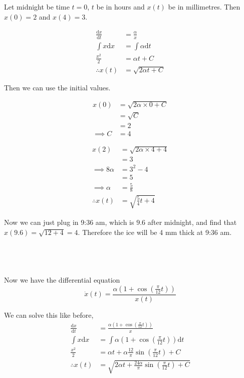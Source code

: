 \documentclass[a4paper]{article}
\begin{document}
\subsection{~}

Let midnight be time $t = 0$, $t$ be in hours and $x(t)$ be in millimetres. Then $x(0) = 2$ and $x(4) = 3$.

\begin{align*}
	\frac{\mathrm d x}{\mathrm d t} &= \frac{\alpha}{x}\\
	\int x \mathrm d x              &= \int \alpha \mathrm d t\\
	\frac{x^2}{2}                   &= \alpha t + C\\
	\therefore x(t)                 &= \sqrt{2\alpha t + C}
\end{align*}

Then we can use the initial values.

\begin{align*}
	x(0) &= \sqrt{2 \alpha \times 0 + C}\\
		 &= \sqrt C\\
		 &= 2\\
	\implies C &= 4
\end{align*}

\begin{align*}
	x(2) &= \sqrt{2 \alpha \times 4 + 4}\\
		 &= 3\\
	\implies 8 \alpha &= 3^2 - 4\\
					  &= 5\\
	\implies \alpha &= \frac58\\
	\therefore x(t) &= \sqrt{\frac54 t + 4}
\end{align*}

Now we can just plug in 9:36 am, which is $9.6$ after midnight, and find that $x(9.6) = \sqrt{12 + 4} = 4$. Therefore the ice will be 4 mm thick at 9:36 am.

\subsection{~}

Now we have the differential equation $$\dot x(t) = \frac{\alpha \left(1 + \cos\left( \frac{\pi}{12} t \right)\right)}{x(t)}$$

We can solve this like before, \begin{align*}
	\frac{\mathrm d x}{\mathrm d t} &= \frac{\alpha \left(1 + \cos\left( \frac{\pi}{12} t \right)\right)}{x}\\[1ex]
	\int x \mathrm d x &= \int \alpha \left( 1 + \cos\left(\frac{\pi}{12} t\right) \right) \mathrm d t\\[1ex]
	\frac{x^2}{2} &= \alpha t + \alpha \frac{12}{\pi} \sin \left(\frac{\pi}{12} t\right) + C\\[1ex]
	\therefore x(t) &= \sqrt{2\alpha t + \frac{24\alpha}{\pi} \sin \left(\frac{\pi}{12} t\right) + C}
\end{align*}
\end{document}
